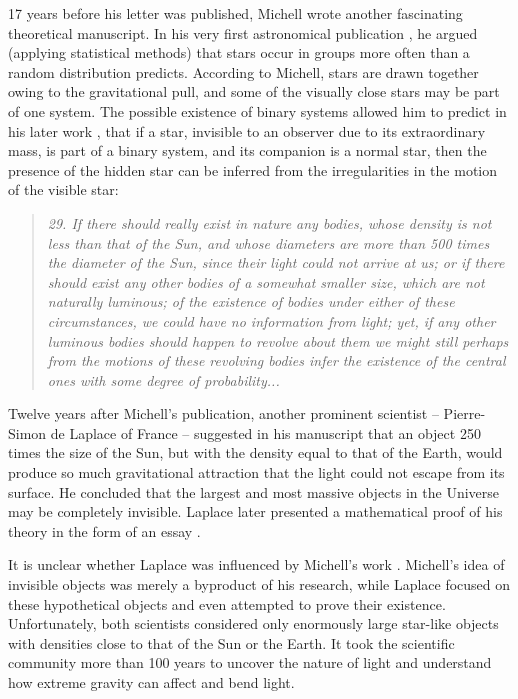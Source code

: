 17 years before his letter was published, Michell wrote another fascinating theoretical manuscript.
In his very first astronomical publication \citep{Michell1767}, he argued (applying statistical methods) that stars occur in groups more often than a random distribution predicts.
According to Michell, stars are drawn together owing to the gravitational pull, and some of the visually close stars may be part of one system.
The possible existence of binary systems allowed him to predict in his later work \citep{Michell1784}, that if a star, invisible to an observer due to its extraordinary mass, is part of a binary system, and its companion is a normal star, then the presence of the hidden star can be inferred from the irregularities in the motion of the visible star:
\begin{quotation}
    \textit{
        29. If there should really exist in nature any bodies, whose density is not less than that of the Sun, and whose diameters are more than 500 times the diameter of the Sun, since their light could not arrive at us; or if there should exist any other bodies of a somewhat smaller size, which are not naturally luminous; of the existence of bodies under either of these circumstances, we could have no information from light; yet, if any other luminous bodies should happen to revolve about them we might still perhaps from the motions of these revolving bodies infer the existence of the central ones with some degree of probability...
    }
\end{quotation}


Twelve years after Michell's publication, another prominent scientist -- Pierre-Simon de Laplace of France -- suggested in his manuscript that an object 250 times the size of the Sun, but with the density equal to that of the Earth, would produce so much gravitational attraction that the light could not escape from its surface.
He concluded that the largest and most massive objects in the Universe may be completely invisible.
Laplace later presented a mathematical proof of his theory in the form of an essay \citep{Laplace1799}.


It is unclear whether Laplace was influenced by Michell's work \citep{Montgomery2009}.
Michell's idea of invisible objects was merely a byproduct of his research, while Laplace focused on these hypothetical objects and even attempted to prove their existence.
Unfortunately, both scientists considered only enormously large star-like objects with densities close to that of the Sun or the Earth.
It took the scientific community more than 100 years to uncover the nature of light and understand how extreme gravity can affect and bend light.

